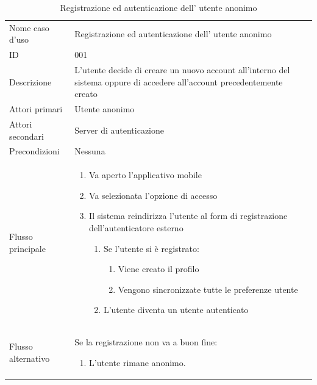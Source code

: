 \documentclass{article}
\begin{document}
\begin{table}[htbp]
    \label{8.1.1}
    \centering
    \begin{tabularx}{\textwidth}{| l | p{} |}
        \Xhline{2pt} %
        Nome caso d'uso & Registrazione ed autenticazione dell' utente anonimo \\
        \Xhline{2pt} %
        ID & 001 \\
        \hline
        Descrizione & L'utente decide di creare un nuovo account all'interno del sistema oppure di accedere all'account precedentemente creato\\
        \hline
        Attori primari & Utente anonimo \\
        \hline
        Attori secondari & Server di autenticazione \\
        \hline
        Precondizioni & Nessuna \\
        \hline
        Flusso principale & 
        \begin{enumerate}[topsep=5pt,partopsep=0pt,parsep=0pt,itemsep=0pt,before=\vspace{-\baselineskip},after=\vspace{-\baselineskip}]                
            \item Va aperto l'applicativo mobile
            \item Va selezionata l'opzione di accesso
            \item Il sistema reindirizza l'utente al form di registrazione dell'autenticatore esterno
            \begin{enumerate}[leftmargin=*, nosep]
                \item Se l'utente si è registrato:
                \begin{enumerate}[leftmargin=*, nosep]
                    \item Viene creato il profilo
                    \item Vengono sincronizzate tutte le preferenze utente
                \end{enumerate}
                \item L'utente diventa un utente autenticato
            \end{enumerate}
        \end{enumerate}
        \\
        \hline
        Flusso alternativo & 
        Se la registrazione non va a buon fine:
        \begin{enumerate}[topsep=12pt,partopsep=0pt,parsep=0pt,itemsep=0pt,before=\vspace{-\baselineskip},after=\vspace{-\baselineskip}]
            \item L'utente rimane anonimo.
        \end{enumerate}
        \\
        \hline
    \end{tabularx}
    \caption{Registrazione ed autenticazione dell' utente anonimo}
    \label{tab:tabella_use_case001}
\end{table}
\end{document}
